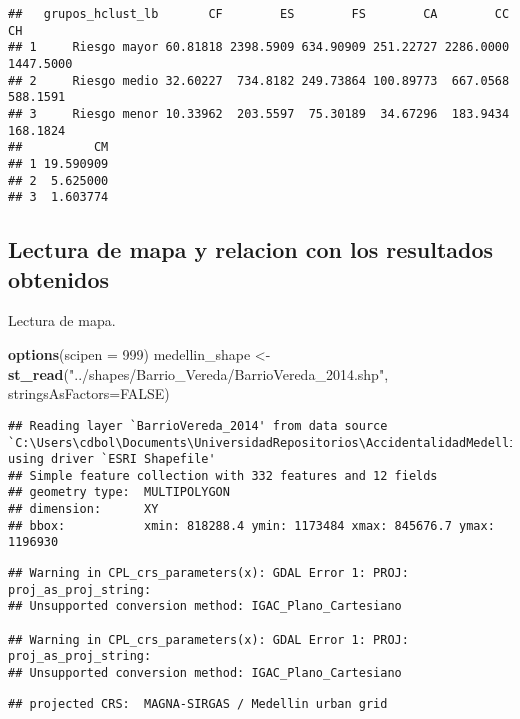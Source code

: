 \documentclass[
]{article}
\newenvironment{Shaded}{\begin{snugshade}}{\end{snugshade}}
\newcommand{\DataTypeTok}[1]{\textcolor[rgb]{0.13,0.29,0.53}{#1}}
\newcommand{\DecValTok}[1]{\textcolor[rgb]{0.00,0.00,0.81}{#1}}
\newcommand{\KeywordTok}[1]{\textcolor[rgb]{0.13,0.29,0.53}{\textbf{#1}}}
\newcommand{\NormalTok}[1]{#1}
\newcommand{\OtherTok}[1]{\textcolor[rgb]{0.56,0.35,0.01}{#1}}
\newcommand{\StringTok}[1]{\textcolor[rgb]{0.31,0.60,0.02}{#1}}
\begin{document}
\begin{verbatim}
##   grupos_hclust_lb       CF        ES        FS        CA        CC        CH
## 1     Riesgo mayor 60.81818 2398.5909 634.90909 251.22727 2286.0000 1447.5000
## 2     Riesgo medio 32.60227  734.8182 249.73864 100.89773  667.0568  588.1591
## 3     Riesgo menor 10.33962  203.5597  75.30189  34.67296  183.9434  168.1824
##          CM
## 1 19.590909
## 2  5.625000
## 3  1.603774
\end{verbatim}

\hypertarget{lectura-de-mapa-y-relacion-con-los-resultados-obtenidos}{%
\subsection{Lectura de mapa y relacion con los resultados
obtenidos}\label{lectura-de-mapa-y-relacion-con-los-resultados-obtenidos}}

Lectura de mapa.

\begin{Shaded}
\begin{Highlighting}[]
\KeywordTok{options}\NormalTok{(}\DataTypeTok{scipen =} \DecValTok{999}\NormalTok{)}
\NormalTok{medellin_shape <-}\StringTok{ }\KeywordTok{st_read}\NormalTok{(}\StringTok{"../shapes/Barrio_Vereda/BarrioVereda_2014.shp"}\NormalTok{, }\DataTypeTok{stringsAsFactors=}\OtherTok{FALSE}\NormalTok{)}
\end{Highlighting}
\end{Shaded}

\begin{verbatim}
## Reading layer `BarrioVereda_2014' from data source `C:\Users\cdbol\Documents\UniversidadRepositorios\AccidentalidadMedellin\shapes\Barrio_Vereda\BarrioVereda_2014.shp' using driver `ESRI Shapefile'
## Simple feature collection with 332 features and 12 fields
## geometry type:  MULTIPOLYGON
## dimension:      XY
## bbox:           xmin: 818288.4 ymin: 1173484 xmax: 845676.7 ymax: 1196930
\end{verbatim}

\begin{verbatim}
## Warning in CPL_crs_parameters(x): GDAL Error 1: PROJ: proj_as_proj_string:
## Unsupported conversion method: IGAC_Plano_Cartesiano

## Warning in CPL_crs_parameters(x): GDAL Error 1: PROJ: proj_as_proj_string:
## Unsupported conversion method: IGAC_Plano_Cartesiano
\end{verbatim}

\begin{verbatim}
## projected CRS:  MAGNA-SIRGAS / Medellin urban grid
\end{verbatim}
\end{document}
